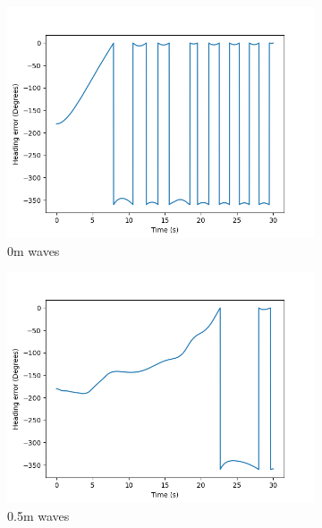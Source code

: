 \documentclass[class=article, crop=false]{standalone}
\begin{document}
\begin{figure}
    \centering
    \begin{subfigure}{0.65\textwidth}
        \centering
        \includegraphics{scenario1/rov-50m/0.0m/usv_heading_error_controlled}
        \caption{0m waves}
        \label{fig:heading_error_0m}
    \end{subfigure}
    \vfill
    \begin{subfigure}{0.65\textwidth}
        \centering
        \includegraphics{scenario1/rov-50m/0.5m/usv_heading_error_controlled}
        \caption{0.5m waves}
    \end{subfigure}
    \vfill
    \begin{subfigure}{0.65\textwidth}
        \centering

\end{subfigure}
\end{figure}
\end{document}
